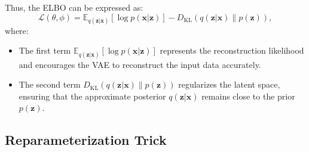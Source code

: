 \documentclass[a4paper,12pt]{article}
\begin{document}
Thus, the ELBO can be expressed as:
\[
\mathcal{L}(\theta, \phi) = \mathbb{E}_{q(\mathbf{z}|\mathbf{x})} \left[ \log p(\mathbf{x}|\mathbf{z}) \right] - D_{\text{KL}} \left( q(\mathbf{z}|\mathbf{x}) \| p(\mathbf{z}) \right),
\]
where:
\begin{itemize}
    \item The first term $\mathbb{E}_{q(\mathbf{z}|\mathbf{x})} \left[ \log p(\mathbf{x}|\mathbf{z}) \right]$ represents the reconstruction likelihood and encourages the VAE to reconstruct the input data accurately.
    \item The second term $D_{\text{KL}} \left( q(\mathbf{z}|\mathbf{x}) \| p(\mathbf{z}) \right)$ regularizes the latent space, ensuring that the approximate posterior $q(\mathbf{z}|\mathbf{x})$ remains close to the prior $p(\mathbf{z})$.
\end{itemize}



\subsection{Reparameterization Trick}
\end{document}
